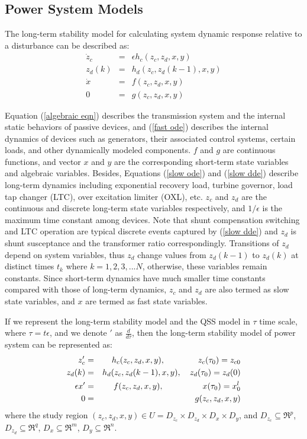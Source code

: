\documentclass[journal]{IEEEtran}
\newcommand{\ee}{\epsilon}
\begin{document}
\subsection{Power System Models}
The long-term stability model for calculating system dynamic response relative to a disturbance can be described as:
\begin{eqnarray}
\dot{z}_{c}&=&\ee{h}_c({z_c,z_d,x,y})\label{slow ode}\\
{z}_d(k)&=&{h}_d({z_c,z_d(k-1),x,y})\label{slow dde}\\
\dot{{x}}&=&{f}({z_c,z_d,x,y})\label{fast ode}\\
{0}&=&{g}({z_c,z_d,x,y})\label{algebraic eqn}
\end{eqnarray}

Equation (\ref{algebraic eqn}) describes the transmission system and the internal static behaviors of passive devices, and (\ref{fast ode}) describes the internal dynamics of devices such as generators, their associated control systems, certain loads, and other dynamically modeled components. ${f}$ and ${g}$ are continuous functions, and vector ${x}$ and ${y}$ are the corresponding short-term state variables and algebraic variables. Besides, Equations (\ref{slow ode}) and (\ref{slow dde}) describe long-term dynamics including exponential recovery load, turbine governor, load tap changer (LTC), over excitation limiter (OXL), etc. ${z}_c$ and ${z}_d$ are the continuous and discrete long-term state variables respectively, and $1/\ee$ is the maximum time constant among devices. Note that shunt compensation switching and LTC operation are typical discrete events captured by (\ref{slow dde}) and $z_d$ is shunt susceptance and the transformer ratio correspondingly. Transitions of $z_d$ depend on system variables, thus $z_d$ change values from $z_d(k-1)$ to $z_d(k)$ at distinct times $t_k$ where $k=1,2,3,...N$, otherwise, these variables remain constants. Since short-term dynamics have much smaller time constants compared with those of long-term dynamics, $z_c$ and $z_d$ are also termed as slow state variables, and $x$ are termed as fast state variables.

If we represent the long-term stability model and the QSS model in $\tau$ time scale, where $\tau=t\ee$, and we denote $\prime$ as $\frac{d}{d\tau}$, then the long-term stability model of power system can be represented as:
\begin{eqnarray}\label{complete}
{z}_{c}^\prime&=&{h}_c({z_c,z_d,x,y}),\hspace{0.55in}{z_c(\tau_0)=z_{c0}}\\
z_d(k)&=&h_d(z_c,z_d(k-1),x,y),\quad z_d(\tau_0)=z_{d}(0)\nonumber\\
\ee{x}^\prime&=&{f}({z_c,z_d,x,y}),\hspace{0.65in}{x(\tau_0)=x_0^l}\nonumber\\
{0}&=&{g}({z_c,z_d,x,y})\nonumber \end{eqnarray}
where the study region $(z_c,z_d,x,y)\in U={D_{z_c}}\times{D_{z_d}}\times{D_{x}}\times{D_{y}}$, and $D_{z_c}\subseteq\Re^p$, $D_{z_d}\subseteq\Re^q$, $D_x\subseteq\Re^m$, $D_y\subseteq\Re^n$.
\end{document}
